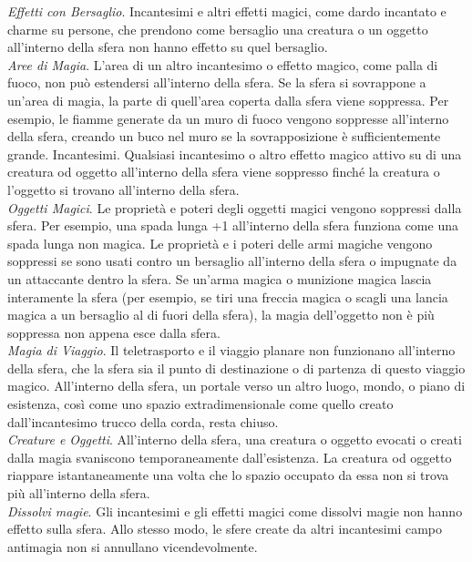 \begin{multicols}{2}
\textit{Effetti con Bersaglio}. Incantesimi e altri effetti magici, come dardo incantato e charme su persone, che prendono come bersaglio una creatura o un oggetto all'interno della sfera non hanno effetto su quel bersaglio.\\
\textit{Aree di Magia}. L'area di un altro incantesimo o effetto magico, come palla di fuoco, non può estendersi all'interno della sfera. Se la sfera si sovrappone a un'area di magia, la parte di quell'area coperta dalla sfera viene soppressa. Per esempio, le fiamme generate da un muro di fuoco vengono soppresse all'interno della sfera, creando un buco nel muro se la sovrapposizione è sufficientemente grande. Incantesimi. Qualsiasi incantesimo o altro effetto magico attivo su di una creatura od oggetto all'interno della sfera viene soppresso finché la creatura o l'oggetto si trovano all'interno della sfera.\\
\textit{Oggetti Magici}. Le proprietà e poteri degli oggetti magici vengono soppressi dalla sfera. Per esempio, una spada lunga +1 all'interno della sfera funziona come una spada lunga non magica. Le proprietà e i poteri delle armi magiche vengono soppressi se sono usati contro un bersaglio all'interno della sfera o impugnate da un attaccante dentro la sfera. Se un'arma magica o munizione magica lascia interamente la sfera (per esempio, se tiri una freccia magica o scagli una lancia magica a un bersaglio al di fuori della sfera), la magia dell'oggetto non è più soppressa non appena esce dalla sfera.\\
\textit{Magia di Viaggio}. Il teletrasporto e il viaggio planare non funzionano all'interno della sfera, che la sfera sia il punto di destinazione o di partenza di questo viaggio magico. All'interno della sfera, un portale verso un altro luogo, mondo, o piano di esistenza, così come uno spazio extradimensionale come quello creato dall'incantesimo trucco della corda, resta chiuso.\\
\textit{Creature e Oggetti}. All'interno della sfera, una creatura o oggetto evocati o creati dalla magia svaniscono temporaneamente dall'esistenza. La creatura od oggetto riappare istantaneamente una volta che lo spazio occupato da essa non si trova più all'interno della sfera.\\
\textit{Dissolvi magie}. Gli incantesimi e gli effetti magici come dissolvi magie non hanno effetto sulla sfera. Allo stesso modo, le sfere create da altri incantesimi campo antimagia non si annullano vicendevolmente.


\end{multicols}
